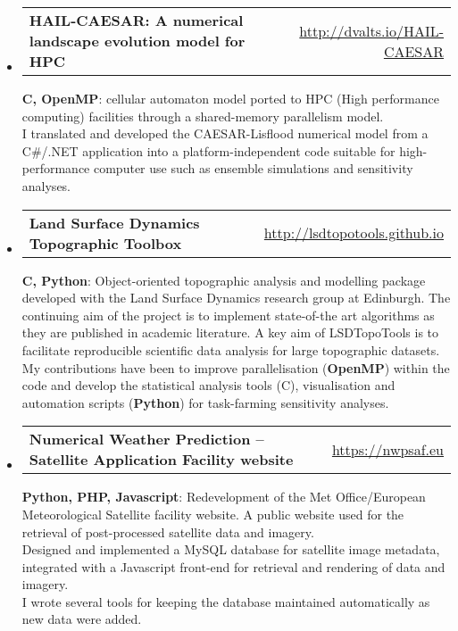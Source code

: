 \documentclass[10.5pt,a4]{article}
\makeatletter
\newcommand{\headerrow}[2]
{\begin{tabular*}{\linewidth}{l@{\extracolsep{\fill}}r}
	#1 &
	#2 \\
\end{tabular*}}
\newcommand{\CPP}
{C\nolinebreak[4]\hspace{-.05em}\raisebox{.22ex}{\footnotesize\bf ++}}
\makeatother
\begin{document}
\begin{itemize}
	\item
	\headerrow
		{\textbf{HAIL-CAESAR: A numerical landscape evolution model for HPC}}
		{\url{http://dvalts.io/HAIL-CAESAR}}

		\textbf{{\CPP}, OpenMP}: cellular automaton model ported to HPC (High performance computing) facilities through a shared-memory parallelism model. \\
		I translated and developed the CAESAR-Lisflood numerical model from a C{\#}/.NET application into a platform-independent code suitable for high-performance computer use such as ensemble simulations and sensitivity analyses. 


	\item
	\headerrow
		{\textbf{Land Surface Dynamics Topographic Toolbox}}
		{\url{http://lsdtopotools.github.io}}

		\textbf{{\CPP}, Python}: Object-oriented topographic analysis and modelling package developed with the Land Surface Dynamics research group at Edinburgh. The continuing aim of the project is to implement state-of-the art algorithms as they are published in academic literature. A key aim of LSDTopoTools is to facilitate reproducible scientific data analysis for large topographic datasets. \\
		My contributions have been to improve parallelisation (\textbf{OpenMP}) within the code and develop the statistical analysis tools (\CPP), visualisation and automation scripts (\textbf{Python}) for task-farming sensitivity analyses.
	
	\item
	\headerrow
		{\textbf{Numerical Weather Prediction -- Satellite Application Facility website}}
		{\url{https://nwpsaf.eu}}

		\textbf{Python, PHP, Javascript}: Redevelopment of the Met Office/European Meteorological Satellite facility website. A public website used for the retrieval of post-processed satellite data and imagery. \\
		Designed and implemented a MySQL database for satellite image metadata, integrated with a Javascript front-end for retrieval and rendering of data and imagery. \\
		I wrote several tools for keeping the database maintained automatically as new data were added. 

\end{itemize}
\end{document}
